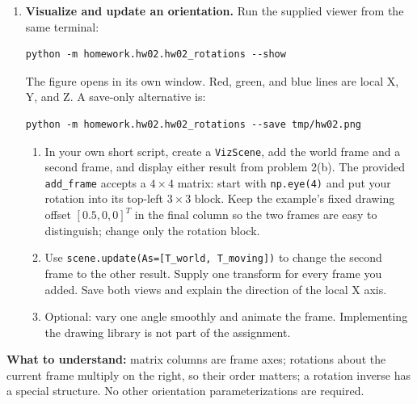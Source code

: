 \begin{enumerate}[start=4]
\item \textbf{Visualize and update an orientation.}
Run the supplied viewer from the same terminal:
\begin{lstlisting}
python -m homework.hw02.hw02_rotations --show
\end{lstlisting}
The figure opens in its own window. Red, green, and blue lines are local
X, Y, and Z. A save-only alternative is:
\begin{lstlisting}
python -m homework.hw02.hw02_rotations --save tmp/hw02.png
\end{lstlisting}
\begin{enumerate}
\item In your own short script, create a \texttt{VizScene}, add the world
frame and a second frame, and display either result from problem 2(b).
The provided \texttt{add\_frame} accepts a $4\times4$ matrix: start with
\texttt{np.eye(4)} and put your rotation into its top-left $3\times3$ block.
Keep the example's fixed drawing offset $[0.5,0,0]^T$ in the final column
so the two frames are easy to distinguish; change only the rotation block.
\item Use \texttt{scene.update(As=[T\_world, T\_moving])} to change the
second frame to the other result. Supply one transform for every frame you
added. Save both views and explain the direction of the local X axis.
\item Optional: vary one angle smoothly and animate the frame. Implementing
the drawing library is not part of the assignment.
\end{enumerate}
\end{enumerate}

\textbf{What to understand:} matrix columns are frame axes; rotations about
the current frame multiply on the right, so their order matters; a rotation
inverse has a special structure.
No other orientation parameterizations are required.

\submission

